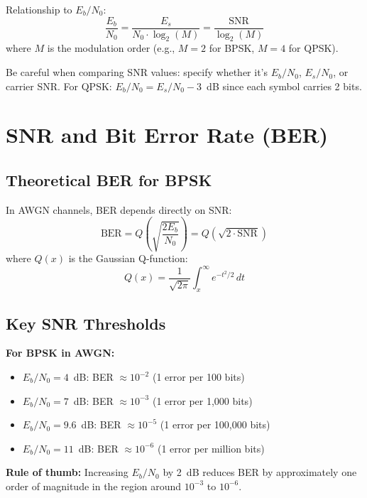 Relationship to $E_b/N_0$:
\begin{equation}
\frac{E_b}{N_0} = \frac{E_s}{N_0 \cdot \log_2(M)} = \frac{\mathrm{SNR}}{\log_2(M)}
\end{equation}
where $M$ is the modulation order (e.g., $M=2$ for BPSK, $M=4$ for QPSK).

\begin{warningbox}
Be careful when comparing SNR values: specify whether it's $E_b/N_0$, $E_s/N_0$, or carrier SNR. For QPSK: $E_b/N_0 = E_s/N_0 - 3$~dB since each symbol carries 2 bits.
\end{warningbox}

\section{SNR and Bit Error Rate (BER)}

\subsection{Theoretical BER for BPSK}

In AWGN channels, BER depends directly on SNR:
\begin{equation}
\mathrm{BER} = Q\left(\sqrt{\frac{2E_b}{N_0}}\right) = Q\left(\sqrt{2 \cdot \mathrm{SNR}}\right)
\end{equation}
where $Q(x)$ is the Gaussian Q-function:
\begin{equation}
Q(x) = \frac{1}{\sqrt{2\pi}} \int_x^\infty e^{-t^2/2}\,dt
\end{equation}

\subsection{Key SNR Thresholds}

\textbf{For BPSK in AWGN:}
\begin{itemize}
\item $E_b/N_0 = 4$~dB: BER $\approx 10^{-2}$ (1 error per 100 bits)
\item $E_b/N_0 = 7$~dB: BER $\approx 10^{-3}$ (1 error per 1,000 bits)
\item $E_b/N_0 = 9.6$~dB: BER $\approx 10^{-5}$ (1 error per 100,000 bits)
\item $E_b/N_0 = 11$~dB: BER $\approx 10^{-6}$ (1 error per million bits)
\end{itemize}

\textbf{Rule of thumb:} Increasing $E_b/N_0$ by 2~dB reduces BER by approximately one order of magnitude in the region around $10^{-3}$ to $10^{-6}$.

